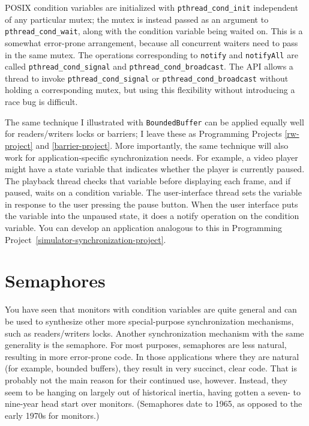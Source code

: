POSIX condition variables are initialized with \verb|pthread_cond_init|
independent of any particular mutex; the mutex is instead passed as an
argument to \verb|pthread_cond_wait|, along with the condition
variable being waited on.  This is a somewhat error-prone arrangement,
because all concurrent waiters need to pass in the same mutex.  The
operations corresponding to \verb|notify| and \verb|notifyAll| are
called \verb|pthread_cond_signal| and \verb|pthread_cond_broadcast|.
The API allows a thread to invoke
\verb|pthread_|\linebreak[0]\verb|cond_signal| or \verb|pthread_cond_broadcast|
without holding a corresponding mutex, but using this
flexibility without introducing a race bug is difficult.

The same technique I illustrated with \verb|BoundedBuffer| can be applied
equally well for readers/writers locks or barriers; I leave these as
Programming Projects \ref{rw-project} and \ref{barrier-project}.  More importantly, the same technique will also work for
application-specific synchronization needs.  For example, a video
player might have a state variable that indicates whether the player is
currently paused.  The playback thread checks that variable before
displaying each frame, and if paused, waits on a condition variable.
The user-interface thread sets the variable in response to the user
pressing the pause button.  When the user interface puts the variable
into the unpaused state, it does a notify operation on the condition
variable.  You can develop an application analogous to this in
Programming Project~\ref{simulator-synchronization-project}.

\section{Semaphores}\label{semaphores-section}

You have seen that monitors with condition variables are quite general
and can be used to synthesize other more special-purpose
synchronization mechanisms, such as readers/writers locks.  Another
synchronization mechanism with the same generality is the semaphore.
For most purposes, semaphores are less natural, resulting in more
error-prone code.  In those applications where they are natural (for
example, bounded buffers), they result in very succinct, clear code.
That is probably not the main reason for their continued use, however.
Instead, they seem to be hanging on largely out of historical inertia,
having gotten a seven- to nine-year head start over monitors.  (Semaphores date to 1965,
as opposed to the early 1970s for monitors.)


